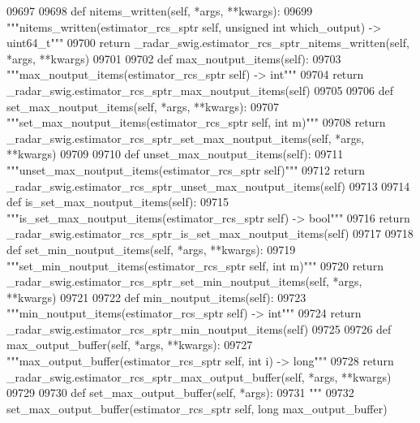 \begin{DoxyCode}
{{{{{{{{{{{{{{{{{{{{{{{{{{{{{{{09697 
09698     \textcolor{keyword}{def }nitems_written(self, *args, **kwargs):
09699         \textcolor{stringliteral}{"""nitems\_written(estimator\_rcs\_sptr self, unsigned int which\_output) -> uint64\_t"""}
09700         \textcolor{keywordflow}{return} \_radar\_swig.estimator\_rcs\_sptr\_nitems\_written(self, *args, **kwargs)
09701 
09702     \textcolor{keyword}{def }max_noutput_items(self):
09703         \textcolor{stringliteral}{"""max\_noutput\_items(estimator\_rcs\_sptr self) -> int"""}
09704         \textcolor{keywordflow}{return} \_radar\_swig.estimator\_rcs\_sptr\_max\_noutput\_items(self)
09705 
09706     \textcolor{keyword}{def }set_max_noutput_items(self, *args, **kwargs):
09707         \textcolor{stringliteral}{"""set\_max\_noutput\_items(estimator\_rcs\_sptr self, int m)"""}
09708         \textcolor{keywordflow}{return} \_radar\_swig.estimator\_rcs\_sptr\_set\_max\_noutput\_items(self, *args, **kwargs)
09709 
09710     \textcolor{keyword}{def }unset_max_noutput_items(self):
09711         \textcolor{stringliteral}{"""unset\_max\_noutput\_items(estimator\_rcs\_sptr self)"""}
09712         \textcolor{keywordflow}{return} \_radar\_swig.estimator\_rcs\_sptr\_unset\_max\_noutput\_items(self)
09713 
09714     \textcolor{keyword}{def }is_set_max_noutput_items(self):
09715         \textcolor{stringliteral}{"""is\_set\_max\_noutput\_items(estimator\_rcs\_sptr self) -> bool"""}
09716         \textcolor{keywordflow}{return} \_radar\_swig.estimator\_rcs\_sptr\_is\_set\_max\_noutput\_items(self)
09717 
09718     \textcolor{keyword}{def }set_min_noutput_items(self, *args, **kwargs):
09719         \textcolor{stringliteral}{"""set\_min\_noutput\_items(estimator\_rcs\_sptr self, int m)"""}
09720         \textcolor{keywordflow}{return} \_radar\_swig.estimator\_rcs\_sptr\_set\_min\_noutput\_items(self, *args, **kwargs)
09721 
09722     \textcolor{keyword}{def }min_noutput_items(self):
09723         \textcolor{stringliteral}{"""min\_noutput\_items(estimator\_rcs\_sptr self) -> int"""}
09724         \textcolor{keywordflow}{return} \_radar\_swig.estimator\_rcs\_sptr\_min\_noutput\_items(self)
09725 
09726     \textcolor{keyword}{def }max_output_buffer(self, *args, **kwargs):
09727         \textcolor{stringliteral}{"""max\_output\_buffer(estimator\_rcs\_sptr self, int i) -> long"""}
09728         \textcolor{keywordflow}{return} \_radar\_swig.estimator\_rcs\_sptr\_max\_output\_buffer(self, *args, **kwargs)
09729 
09730     \textcolor{keyword}{def }set_max_output_buffer(self, *args):
09731         \textcolor{stringliteral}{"""}
09732 \textcolor{stringliteral}{        set\_max\_output\_buffer(estimator\_rcs\_sptr self, long max\_output\_buffer)}
}}}}}}}}}}}}}}}}}}}}}}}}}}}}}}}
\end{DoxyCode}
